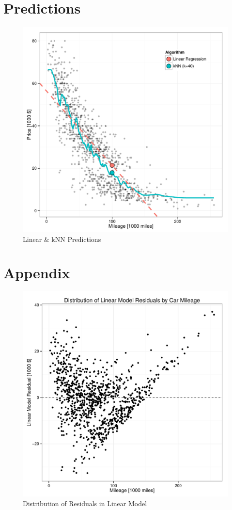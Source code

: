 \documentclass[11pt, fleqn, titlepage]{article}
\begin{document}
\section{Predictions}

\begin{figure}[!htb]
  \centering
  \includegraphics[scale=.5]{predict.pdf}
  \caption{Linear \& kNN Predictions}
  \label{fig:predict}
\end{figure}

\section{Appendix}

\begin{figure}[!htb]
  \centering
  \includegraphics[scale=.5]{lin_errors.pdf}
  \caption{Distribution of Residuals in Linear Model}
  \label{fig:lin_errors}
\end{figure}
\end{document}
